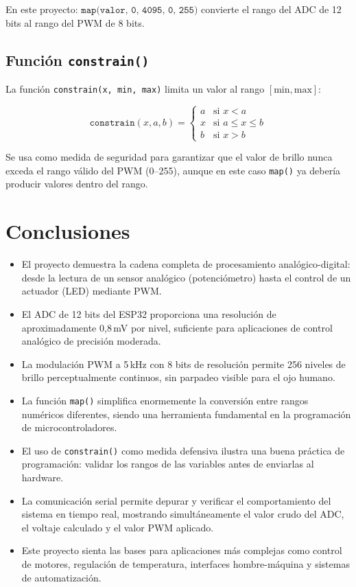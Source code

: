 \documentclass[12pt,a4paper]{article}
\begin{document}
En este proyecto: $\texttt{map(valor, 0, 4095, 0, 255)}$ convierte el rango del ADC de 12 bits al rango del PWM de 8 bits.

\subsection{Función \texttt{constrain()}}

La función \texttt{constrain(x, min, max)} limita un valor al rango $[\text{min}, \text{max}]$:

\begin{equation*}
\texttt{constrain}(x, a, b) = \begin{cases} a & \text{si } x < a \\ x & \text{si } a \leq x \leq b \\ b & \text{si } x > b \end{cases}
\end{equation*}

Se usa como medida de seguridad para garantizar que el valor de brillo nunca exceda el rango válido del PWM (0--255), aunque en este caso \texttt{map()} ya debería producir valores dentro del rango.

\section{Conclusiones}

\begin{itemize}
    \item El proyecto demuestra la cadena completa de procesamiento analógico-digital: desde la lectura de un sensor analógico (potenciómetro) hasta el control de un actuador (LED) mediante PWM.
    \item El ADC de 12 bits del ESP32 proporciona una resolución de aproximadamente 0,8\,mV por nivel, suficiente para aplicaciones de control analógico de precisión moderada.
    \item La modulación PWM a 5\,kHz con 8 bits de resolución permite 256 niveles de brillo perceptualmente continuos, sin parpadeo visible para el ojo humano.
    \item La función \texttt{map()} simplifica enormemente la conversión entre rangos numéricos diferentes, siendo una herramienta fundamental en la programación de microcontroladores.
    \item El uso de \texttt{constrain()} como medida defensiva ilustra una buena práctica de programación: validar los rangos de las variables antes de enviarlas al hardware.
    \item La comunicación serial permite depurar y verificar el comportamiento del sistema en tiempo real, mostrando simultáneamente el valor crudo del ADC, el voltaje calculado y el valor PWM aplicado.
    \item Este proyecto sienta las bases para aplicaciones más complejas como control de motores, regulación de temperatura, interfaces hombre-máquina y sistemas de automatización.
\end{itemize}
\end{document}
